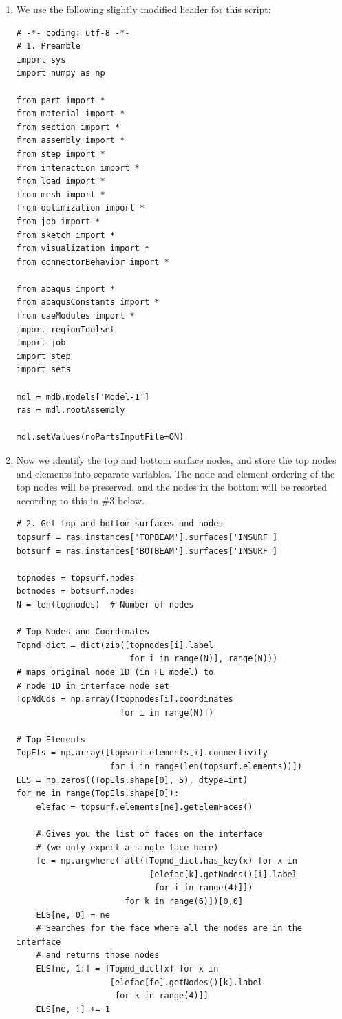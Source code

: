 \documentclass[11pt]{article}
\begin{document}
\begin{enumerate}
\item We use the following slightly modified header for this script:
\begin{verbatim}
# -*- coding: utf-8 -*-
# 1. Preamble
import sys
import numpy as np

from part import *
from material import *
from section import *
from assembly import *
from step import *
from interaction import *
from load import *
from mesh import *
from optimization import *
from job import *
from sketch import *
from visualization import *
from connectorBehavior import *

from abaqus import *
from abaqusConstants import *
from caeModules import * 
import regionToolset
import job
import step
import sets

mdl = mdb.models['Model-1']
ras = mdl.rootAssembly

mdl.setValues(noPartsInputFile=ON)
\end{verbatim}
\item Now we identify the top and bottom surface nodes, and store the top nodes and elements into separate variables.
The node and element ordering of the top nodes will be preserved, and the nodes in the bottom will be resorted according to this in \#3 below.
\begin{verbatim}
# 2. Get top and bottom surfaces and nodes
topsurf = ras.instances['TOPBEAM'].surfaces['INSURF']
botsurf = ras.instances['BOTBEAM'].surfaces['INSURF']

topnodes = topsurf.nodes
botnodes = botsurf.nodes
N = len(topnodes)  # Number of nodes

# Top Nodes and Coordinates
Topnd_dict = dict(zip([topnodes[i].label
                       for i in range(N)], range(N)))
# maps original node ID (in FE model) to
# node ID in interface node set
TopNdCds = np.array([topnodes[i].coordinates
                     for i in range(N)])

# Top Elements
TopEls = np.array([topsurf.elements[i].connectivity
                   for i in range(len(topsurf.elements))])
ELS = np.zeros((TopEls.shape[0], 5), dtype=int)
for ne in range(TopEls.shape[0]):
    elefac = topsurf.elements[ne].getElemFaces()

    # Gives you the list of faces on the interface
    # (we only expect a single face here)
    fe = np.argwhere([all([Topnd_dict.has_key(x) for x in 
                           [elefac[k].getNodes()[i].label
                            for i in range(4)]])
                      for k in range(6)])[0,0]
    ELS[ne, 0] = ne
    # Searches for the face where all the nodes are in the interface
    # and returns those nodes
    ELS[ne, 1:] = [Topnd_dict[x] for x in
                   [elefac[fe].getNodes()[k].label
                    for k in range(4)]]
    ELS[ne, :] += 1


\end{verbatim}
\end{enumerate}
\end{document}
